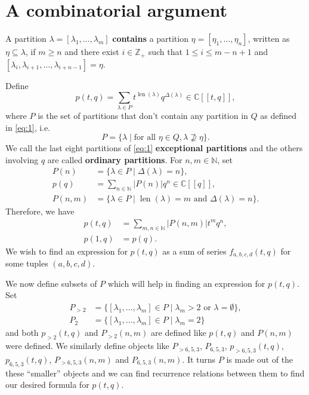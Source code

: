 \documentclass[12pt, reqno]{amsart}
\theoremstyle{remark}
\DeclareMathOperator{\len}{len}
\begin{document}
\section{A combinatorial argument}
\label{sec:comb-argum}

A partition $\lambda = [\lambda_1, \dots, \lambda_m]$ \textbf{contains} a partition $\eta = [\eta_1, \dots, \eta_n]$, written as $\eta \subseteq \lambda$, if $m \ge n$ and there exist $i \in \mathbb{Z}_+$ such that $1 \le i \le m - n + 1$ and $[\lambda_i, \lambda_{i + 1}, \dots, \lambda_{i + n - 1}] = \eta$.

Define
\begin{equation*}
  p(t, q) = \sum_{\lambda \in P}t^{\len(\lambda)}q^{\Delta(\lambda)} \in \mathbb{C}[[t, q]],
\end{equation*}
where $P$ is the set of partitions that don't contain any partition in $Q$ as defined in \eqref{eq:1}, i.e.\
\begin{equation*}
  P = \{\lambda \mid \text{for all }\eta \in Q, \lambda \nsupseteq \eta\}.
\end{equation*}
We call the last eight partitions of \eqref{eq:1} \textbf{exceptional partitions} and the others involving $q$ are called \textbf{ordinary partitions}.
For $n, m \in \mathbb{N}$, set
\begin{align*}
  P(n) &= \{\lambda \in P \mid \Delta(\lambda) = n\}, \\
  p(q) &= \sum_{n \in \mathbb{N}}|P(n)|q^n \in \mathbb{C}[[q]], \\
  P(n, m) &= \{\lambda \in P \mid \len(\lambda) = m\text{ and }\Delta(\lambda) = n\}.
\end{align*}
Therefore, we have
\begin{align*}
  p(t, q) &= \sum_{m, n \in \mathbb{N}}|P(n, m)|t^mq^n, \\
  p(1, q) &= p(q).
\end{align*}
We wish to find an expression for $p(t, q)$ as a sum of series $f_{a, b, c, d}(t, q)$ for some tuples $(a, b, c, d)$.

We now define subsets of $P$ which will help in finding an expression for $p(t, q)$.
Set
\begin{align*}
  P_{>2} &= \{[\lambda_1, \dots, \lambda_m] \in P \mid \lambda_m > 2\text{ or }\lambda = \emptyset\}, \\
  P_2 &= \{[\lambda_1, \dots, \lambda_m] \in P \mid \lambda_m = 2\}
\end{align*}
and both $p_{>2}(t, q)$ and $P_{>2}(n, m)$ are defined like $p(t, q)$ and $P(n, m)$ were defined.
We similarly define objects like $P_{>6, 5, 3}$, $P_{6, 5, 3}$, $p_{>6, 5, 3}(t, q)$, $p_{6, 5, 3}(t, q)$, $P_{>6, 5, 3}(n, m)$ and $P_{6, 5, 3}(n, m)$.
It turns $P$ is made out of the these ``smaller'' objects and we can find recurrence relations between them to find our desired formula for $p(t, q)$.
\end{document}
